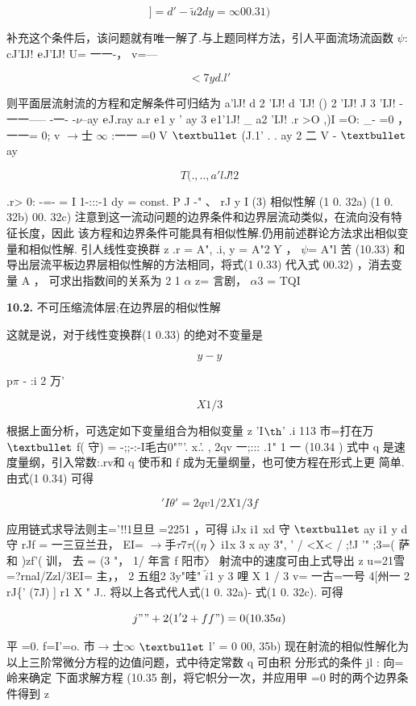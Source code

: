 \[] = d ' - \tilde{u}2 dy = \infty  00.3 1)\]

补充这个条件后，该问题就有唯一解了.与上题同样方法，引人平面流场流函数 $\psi$: cJ'IJ! ${\rm e}$J'IJ! U= 一一-， v=---

\[<7 y d.l'\]

则平面层流射流的方程和定解条件可归结为 a'lJ! d 2 'IJ! d 'IJ! () 2 'IJ! J 3 'IJ! -一一----- -一- -$\nu$--ay ${\rm e}$J.ray a.r ${\rm e}$1 y ' ay 3 ${\rm e}$1'1J! \_ a2 'IJ! .r >O ,)I =O: \_- =0 ，一一= 0; v $\rightarrow$士 $\infty$ :一一 =0 V ${\rm •}$ (J.1' . . ay 2 二 V - ${\rm •}$ ay

\[T (.,.. , a'lJ!   2\]

.r> 0: -=- = I 1-:::-1 dy = const. P J -" 、 rJ y I (3) 相似性解 (1 0. 32a) (1 0. 32b) 00. 32c) 注意到这一流动问题的边界条件和边界层流动类似，在流向没有特征长度，因此 该方程和边界条件可能具有相似性解.仍用前述群论方法求出相似变量和相似性解. 引人线性变换群 z .r = A", .i, y = A"2 Y ， $\psi$= A"l 苦 (10.33) 和导出层流平板边界层相似性解的方法相同，将式(1 0.33) 代入式 00.32) ，消去变量 A ， 可求出指数间的关系为 2 1 $\alpha$ z= 言剧， $\alpha$3 = TQI

\noindent\textbf{10.2.} 不可压缩流体层;在边界层的相似性解

这就是说，对于线性变换群(1 0.33) 的绝对不变量是

\[y - y\]

p$\pi$ - :i 2 万'

\[X 1/ 3\]

根据上面分析，可选定如下变量组合为相似变量 z 'I${\rm þ}$' .i 113 市=打在万 ${\rm •}$ f( 守) = -;;-:-I毛古0"'''. x.'. , 2qv 一;::: .1" 1 一 (10.34 ) 式中 q 是速度量纲，引入常数:.rv和 q 使币和 f 成为无量纲量，也可使方程在形式上更 简单.由式(1 0.34) 可得

\['I\theta ' = 2qv 1/ 2 X 1/ 3 f\]

应用链式求导法则主='!!1旦旦 =2251 ，可得 iJx i1 xd 守 ${\rm •}$ ay i1 y d 守 rJf = 一三豆兰丑， EI= $\rightarrow$手$\tau$7$\tau$(($\eta$ 〉i1x 3 x ay 3", ' / <X< / ;!J '" ;3=( 萨和 )zf'( 训， 去 = (3 "， 1/ 年言 f 阳市〉 射流中的速度可由上式导出 z u=21雪 =?rnal/Zzl/3EI= 主，， 2 五组2 3y"哇" $\tilde{i}$1 y 3 哩 X 1 / 3 v= 一古=一号 4[州一 2 rJ\{' (7J) ] r1 X " J.. 将以上各式代人式(1 0. 32a)- 式(1 0. 32c). 可得

\[j"" + 2( 1'2 + f f") = 0 (10. 35a)\]

平 =0. f=I'=o. 市$\rightarrow$士$\infty$ ${\rm •}$ l' = 0 00, 35b) 现在射流的相似性解化为以上三阶常微分方程的边值问题，式中待定常数 q 可由积 分形式的条件 jl : 向=岭来确定 下面求解方程 (10.35 剖，将它帜分一次，并应用甲 =0 时的两个边界条件得到 z


